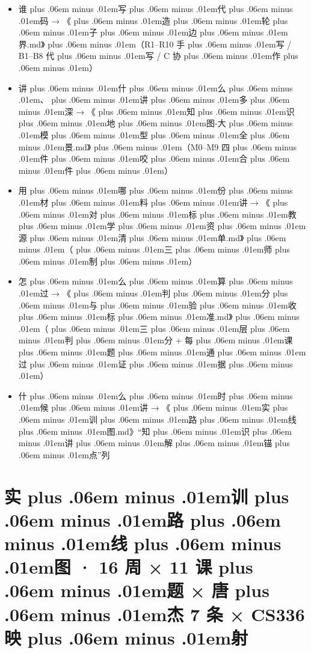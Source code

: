\documentclass[
]{article}
\providecommand{\tightlist}{%
  \setlength{\itemsep}{0pt}\setlength{\parskip}{0pt}}
\def\zh#1{{\zhfont #1}}
\def\sym#1{{\symfont #1}}
\def\zhglue{\hskip0pt plus .06em minus .01em}
\begin{document}
\begin{itemize}
\tightlist
\item
  \zh{谁\zhglue 写\zhglue 代\zhglue 码} \sym{→} \zh{《\zhglue 造\zhglue 轮\zhglue 子\zhglue 边\zhglue 界}.md\zh{》\zhglue （}R1--R10 \zh{手\zhglue 写} / B1--B8 \zh{代\zhglue 写} / C \zh{协\zhglue 作\zhglue ）}
\item
  \zh{讲\zhglue 什\zhglue 么\zhglue 、\zhglue 讲\zhglue 多\zhglue 深} \sym{→} \zh{《\zhglue 知\zhglue 识\zhglue 地\zhglue 图}-\zh{大\zhglue 模\zhglue 型\zhglue 全\zhglue 景}.md\zh{》\zhglue （}M0--M9 \zh{四\zhglue 件\zhglue 咬\zhglue 合\zhglue 件\zhglue ）}
\item
  \zh{用\zhglue 哪\zhglue 份\zhglue 材\zhglue 料\zhglue 讲} \sym{→} \zh{《\zhglue 对\zhglue 标\zhglue 教\zhglue 学\zhglue 资\zhglue 源\zhglue 清\zhglue 单}.md\zh{》\zhglue （\zhglue 三\zhglue 师\zhglue 制\zhglue ）}
\item
  \zh{怎\zhglue 么\zhglue 算\zhglue 过} \sym{→} \zh{《\zhglue 判\zhglue 分\zhglue 与\zhglue 验\zhglue 收\zhglue 标\zhglue 准}.md\zh{》\zhglue （\zhglue 三\zhglue 层\zhglue 判\zhglue 分} + \zh{每\zhglue 课\zhglue 题\zhglue 通\zhglue 过\zhglue 证\zhglue 据\zhglue ）}
\item
  \zh{什\zhglue 么\zhglue 时\zhglue 候\zhglue 讲} \sym{→} \zh{《\zhglue 实\zhglue 训\zhglue 路\zhglue 线\zhglue 图}.md\zh{》}``\zh{知\zhglue 识\zhglue 讲\zhglue 解\zhglue 锚\zhglue 点}''\zh{列}
\end{itemize}

\newpage

\section{\zh{实\zhglue 训\zhglue 路\zhglue 线\zhglue 图} \sym{·} 16 \zh{周} \sym{×} 11 \zh{课\zhglue 题} \sym{×} \zh{唐\zhglue 杰} 7 \zh{条} \sym{×} CS336 \zh{映\zhglue 射}}\label{ux5b9eux8badux8defux7ebfux56fe-16-ux5468-11-ux8bfeux9898-ux5510ux6770-7-ux6761-cs336-ux6620ux5c04}
\end{document}
